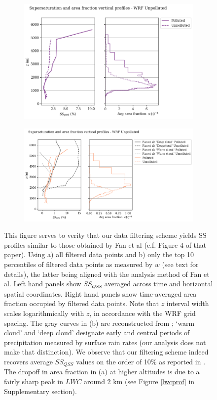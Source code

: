 \documentclass{article}
\begin{document}
\begin{figure}[ht]
	\centering
	\begin{subfigure}{0.7\textwidth}
		\includegraphics[width=\textwidth]{wrf/ss_pred_vs_z_allpts_figure.png}
		\caption{}
		\label{wrfssvertprofallpts}
	\end{subfigure}
	\begin{subfigure}{0.7\textwidth}
		\includegraphics[width=\textwidth]{wrf/ss_pred_vs_z_up10perc_figure.png}
		\caption{}
		\label{wrfssvertprofup50perc}
	\end{subfigure}
	\caption{This figure serves to verity that our data filtering scheme yields SS profiles similar to those obtained by Fan et al (c.f. Figure 4 of that paper). Using a) all filtered data points and b) only the top 10 percentiles of filtered data points as measured by $w$ (see text for details), the latter being aligned with the analysis method of Fan et al. Left hand panels show $SS_{QSS}$ averaged across time and horizontal spatial coordinates. Right hand panels show time-averaged area fraction occupied by filtered data points. Note that $z$ interval width scales logarithmically with $z$, in accordance with the WRF grid spacing. The gray curves in (b) are reconstructed from \cite{Fan2018}; `warm cloud' and `deep cloud' designate early and central periods of precipitation measured by surface rain rates (our analysis does not make that distinction). We observe that our filtering scheme indeed recovers average $SS_{QSS}$ values on the order of 10\% as reported in \cite{Fan2018}. The dropoff in area fraction in (a) at higher altitudes is due to a fairly sharp peak in $LWC$ around 2 km (see Figure \ref{lwcprof} in Supplementary section).}
	\label{wrfssvertprof}
\end{figure}
\end{document}
